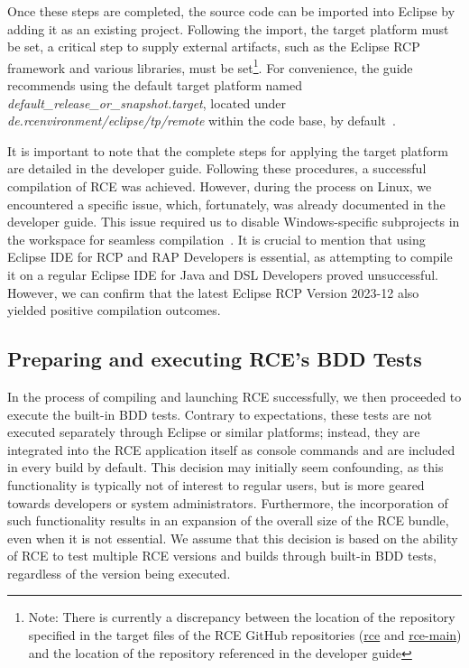 Once these steps are completed, the source code can be imported into Eclipse by adding it as an existing project. Following the import, the target platform must be set, a critical step to supply external artifacts, such as the Eclipse RCP framework and various libraries, must be set\footnote{Note: There is currently a discrepancy between the location of the repository specified in the target files of the RCE GitHub repositories (\href{https://github.com/rcenvironment/rce/blob/master/de.rcenvironment/eclipse/tp/remote/default_release_or_snapshot.target}{rce} and \href{https://github.com/rcenvironment/rce-main/blob/main/de.rcenvironment/eclipse/tp/remote/default_release_or_snapshot.target}{rce-main}) and the location of the repository referenced in the developer guide}. For convenience, the guide recommends using the default target platform named \textit{default\_release\_or\_snapshot.target}, located under \textit{de.rcenvironment/eclipse/tp/remote} within the code base, by default~\cite{rceDevGuide10x}.

It is important to note that the complete steps for applying the target platform are detailed in the developer guide. Following these procedures, a successful compilation of \ac{RCE} was achieved. However, during the process on Linux, we encountered a specific issue, which, fortunately, was already documented in the developer guide. This issue required us to disable Windows-specific subprojects in the workspace for seamless compilation~\cite{rceDevGuide10x}. It is crucial to mention that using Eclipse IDE for RCP and RAP Developers is essential, as attempting to compile it on a regular Eclipse IDE for Java and DSL Developers proved unsuccessful. However, we can confirm that the latest Eclipse RCP Version 2023-12 also yielded positive compilation outcomes.

\subsection{Preparing and executing \ac{RCE}'s BDD Tests}
\label{subsec:PreparingRCETests}
In the process of compiling and launching \ac{RCE} successfully, we then proceeded to execute the built-in BDD tests. Contrary to expectations, these tests are not executed separately through Eclipse or similar platforms; instead, they are integrated into the \ac{RCE} application itself as console commands and are included in every build by default. This decision may initially seem confounding, as this functionality is typically not of interest to regular users, but is more geared towards developers or system administrators. Furthermore, the incorporation of such functionality results in an expansion of the overall size of the \ac{RCE} bundle, even when it is not essential. We assume that this decision is based on the ability of \ac{RCE} to test multiple \ac{RCE} versions and builds through built-in BDD tests, regardless of the version being executed.

